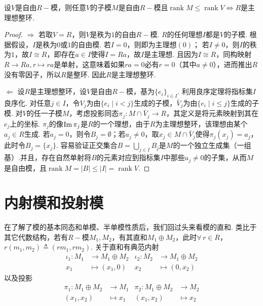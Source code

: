 \begin{theorem}[]
    设$V$是自由$R-\!\!$模，则任意$V$的子模$M$是自由$R-\!\!$模且$\operatorname{rank} M \leq \operatorname{rank} V \Leftrightarrow R$是主理想整环.
\end{theorem}
\begin{proof}
    $\Rightarrow$ 若取$V=R$，则$V$是秩为$1$的自由$R-\!\!$模. $R$的任何理想$I$都是$V$的子模. 
    根据假设，$I$是秩为$0$或$1$的自由模. 若$I=0$，则即为主理想$(0)$；
    若$I \neq 0$，则$I$的秩为$1$，故$I \cong R$，即存在$a \in I$使得$I = Ra$，故$I$是主理想.
    且因为$I \cong R$，同构映射$R \to Ra, r \mapsto ra$是单射，这意味着如果$ra=0$必有$r=0$（其中$a \neq 0$），进而推出$R$没有零因子，所以$R$是整环. 因此$R$是主理想整环.

    $\Leftarrow$ 设$R$是主理想整环，设$V$是自由$R-\!\!$模，基为$\{e_i\}_{i \in I}$. 利用良序定理将指标集$I$良序化. 对任意$j \in I$，令$V_j$为由$\{e_i \mid i < j\}$生成的子模，$\bar{V}_j$为由$\{e_i \mid i \le j\}$生成的子模. 
    对$V$的任一子模$M$，考虑投影同态$\pi_j: M \cap \bar{V}_j \to R$，其定义是将元素映射到其在$e_j$上的坐标. $\pi_j$的像$\operatorname{Im} \pi_j$是$R$的一个理想，由于$R$为主理想整环，该理想由某个$a_j \in R$生成.
    若$a_j = 0$，则令$B_j = \emptyset$；若$a_j \neq 0$，取$x_j \in M \cap \bar{V}_j$使得$\pi_j(x_j) = a_j$，此时令$B_j = \{x_j\}$.
    容易验证正交集合$B = \bigcup_{j \in I} B_j$是$M$的一个独立生成集（一组基）.并且，存在自然单射将$B$的元素对应到指标集$I$中那些$a_j \ne 0$的子集，从而$M$是自由模，且$\operatorname{rank} M = |B| \le |I| = \operatorname{rank} V$.
\end{proof}

\section{内射模和投射模}
在了解了模的基本同态和单模、半单模性质后，我们回过头来看模的直和.
类比于其它代数结构，若有$R-\!\!$模$M_1, M_2$，有其直和$M_1 \oplus M_2$，此时$\forall\, r \in R$，$r(m_1, m_2) \triangleq (rm_1, rm_2)$.
关于直和有典范内射
\begin{align*}
    \iota_1: M_1 &\to M_1 \oplus M_2 & \iota_2: M_2 &\to M_1 \oplus M_2 \\[-7pt]
    x_1 &\mapsto (x_1, 0) & x_2 &\mapsto (0, x_2)
\end{align*}
以及投影
\begin{align*}
    \pi_1: M_1 \oplus M_2 &\to M_1 & \pi_2: M_1 \oplus M_2 &\to M_2 \\[-7pt]
    (x_1, x_2) &\mapsto x_1 & (x_1, x_2) &\mapsto x_2
\end{align*}

